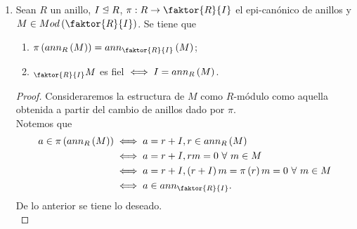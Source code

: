 \documentclass{article}
\begin{document}
\begin{enumerate}[label=\textbf{Ej \arabic*.}]
\begin{proof}
Ahora, si $a\in R$, $(zr)\cdot m=z\cdot(r\cdot m)=z\cdot 0=0$. Por lo tanto $ann_R(M)\unlhd R$.\\
\\
$\displaystyle ann_{\faktor{R}{ann_R(M)}}(M)=\{r\in \faktor{R}{ann_R(M)}\,|\, [r]\cdot m=0\}$ con $[r]$ denotando la clase de $r\in R$ bajo la
relación de equivalencia. Ahora, como $[r]\cdot m=0,$ entonces 
\[0=(r+ann_R(M))\cdot m=r\cdot m+0,\]
y así $r\in ann_R(M)$, es decir, $[r]=0$. Por lo tanto $M$ es un \\ $\faktor{R}{ann_R(M)}$-módulo fiel.\\
\\
Sean $f\in\operatorname{Hom}_R(R,M)$ y $r\in ann_R(M)$, entonces $r\cdot m=0\,\,\forall m\in M$ así, como $f$ es morfismo
$f(r)=r\cdot f(1)=0$ pues $f(1)\in M$. Por lo tanto $ann_R(M)\leq Ker(f)$.\\
\\
Sea $N\in Mod(R)$ tal que existe $h\in \operatorname{Hom}_R(M,N)$ isomorfismo. Entonces para cada $n\in N$ existe un único $m\in M$
tal que $h(m)=n$, así 
\begin{align*}
r\in ann_R(M) &\iff r\cdot m=0\,\,\,\forall m\in M\\
&\iff h(r\cdot m)=0\,\,\,\forall m\in M\\
&\iff r\cdot h(m)=0\,\,\,\forall m\in M\\
&\iff r\cdot n=0\,\,\,\forall n\in N\\
& \iff r\in ann_R(N).
\end{align*}
\end{proof}
		
		\item Sean $R$ un anillo, $I\subnormeq R$, $\pi:R\to\faktor{R}{I}$ el epi-canónico de anillos y $M\in Mod\lrprth{\faktor{R}{I}}$. Se tiene que
		\begin{enumerate}
			\item $\pi\lrprth{ann_R\lrprth{M}}=ann_{\faktor{R}{I}}\lrprth{M}$;
			\item $\ringmod{\faktor{R}{I}}{M}{l}$ es fiel $\iff I=ann_R \left(M\right)$.
		\end{enumerate}
		\begin{proof}
			Consideraremos la estructura de $M$ como $R$-módulo como aquella obtenida a partir del cambio de anillos dado por $\pi$.\\
			 Notemos que
			 \begin{align*}
				a\in\pi\lrprth{ann_R\lrprth{M}}&\iff  a=r+I, r\in ann_{R}\lrprth{M}\\
				&\iff  a=r+I, rm=0\ \forall\ m\in M\\
				&\iff  a=r+I, \lrprth{r+I}m=\pi\lrprth{r}m=0\ \forall\ m\in M\\
				&\iff  a\in ann_{\faktor{R}{I}}.
			\end{align*}
			De lo anterior se tiene lo deseado.\\
			

\end{proof}
\end{enumerate}
\end{document}
